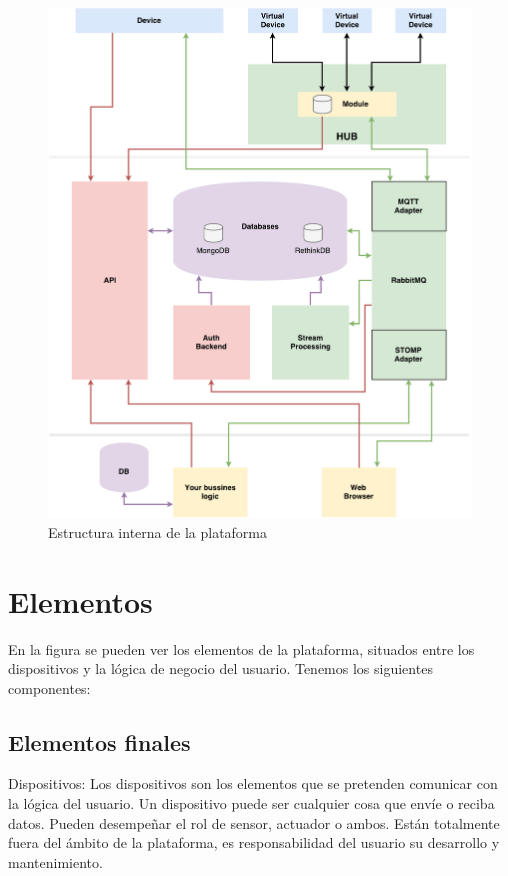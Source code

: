 \begin{figure}[htbp]
\centering
\includegraphics[width=\linewidth]{02-arquitectura/figuras/fig002}
\caption{Estructura interna de la plataforma}
\label{fig:figura2}
\end{figure}

\section{Elementos}

En la figura se pueden ver los elementos de la plataforma, situados entre los
dispositivos y la lógica de negocio del usuario. Tenemos los siguientes
componentes:

\subsection{Elementos finales}

Dispositivos: Los dispositivos son los elementos que se pretenden comunicar con
la lógica del usuario. Un dispositivo puede ser cualquier cosa que envíe o
reciba datos. Pueden desempeñar el rol de sensor, actuador o ambos. Están
totalmente fuera del ámbito de la plataforma, es responsabilidad del usuario su
desarrollo y mantenimiento.

